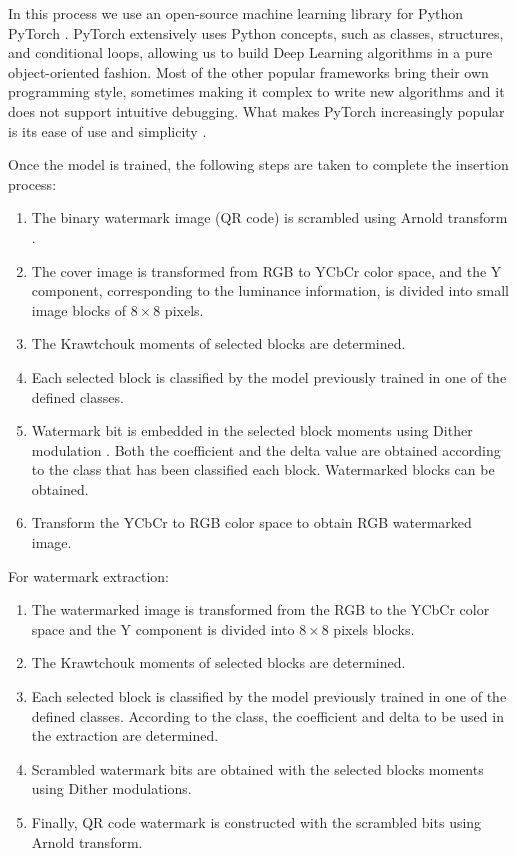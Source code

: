 \documentclass[runningheads]{llncs}
\begin{document}
In this process we use an open-source machine learning library for Python PyTorch \cite{paszke2017pytorch}. PyTorch extensively uses Python concepts, such as classes, structures, and conditional loops, allowing us to build Deep Learning algorithms in a pure object-oriented fashion. Most of the other popular frameworks bring their own programming style, sometimes making it complex to write new algorithms and it does not support intuitive debugging. What makes PyTorch increasingly popular is its ease of use and simplicity \cite{Subramanian2018}.

Once the model is trained, the following steps are taken to complete the insertion process:
\begin{enumerate}
	\item The binary watermark image (QR code) is scrambled using Arnold transform \cite{Arnol'd:1987366}.
	\item The cover image is transformed from RGB to YCbCr color space, and the Y component, corresponding to the luminance information, is divided into small image blocks of $8\times 8$ pixels.
	\item The Krawtchouk moments \cite{Yap2003} of selected blocks are determined.
	\item Each selected block is classified by the model previously trained in one of the defined classes.
	\item Watermark bit is embedded in the selected block moments using Dither modulation \cite{chen2001quantization}. Both the coefficient and the delta value are obtained according to the class that has been classified each block. Watermarked blocks can be obtained. 
	\item Transform the YCbCr to RGB color space to obtain RGB watermarked image.
\end{enumerate}

For watermark extraction:
\begin{enumerate}
	\item The watermarked image is transformed from the RGB to the YCbCr color space and the Y component is divided into $8\times 8$ pixels blocks.
	\item The Krawtchouk moments of selected blocks are determined.
	\item Each selected block is classified by the model previously trained in one of the defined classes. According to the class, the coefficient and delta to be used in the extraction are determined.
	\item Scrambled watermark bits are obtained with the selected blocks moments using Dither modulations.
	\item Finally, QR code watermark is constructed with the scrambled bits using Arnold transform.
\end{enumerate}
\end{document}
